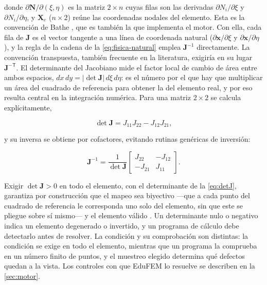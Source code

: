 donde $\partial\bm{N}/\partial(\xi,\eta)$ es la matriz $2\times n$ cuyas filas son las derivadas $\partial N_i/\partial\xi$ y $\partial N_i/\partial\eta$, y $\bm{X}_e$ ($n\times 2$) reúne las coordenadas nodales del elemento. Esta es la convención de Bathe \autocite[p.~345]{bathe2014fem}, que es también la que implementa el motor. Con ella, cada fila de $\bm{J}$ es el vector tangente a una línea de coordenada natural ($\partial\bm{x}/\partial\xi$ y $\partial\bm{x}/\partial\eta$), y la regla de la cadena de la \autoref{eq:fisica-natural} emplea $\bm{J}^{-1}$ directamente. La convención transpuesta, también frecuente en la literatura, exigiría en su lugar $\bm{J}^{-\mathsf{T}}$. El determinante del Jacobiano mide el factor local de cambio de área entre ambos espacios, $dx\,dy = |\det\bm{J}|\,d\xi\,d\eta$: es el número por el que hay que multiplicar un área del cuadrado de referencia para obtener la del elemento real, y por eso resulta central en la integración numérica. Para una matriz $2\times2$ se calcula explícitamente,

\begin{equation}
\det\bm{J} = J_{11}J_{22} - J_{12}J_{21},
\label{eq:detJ}
\end{equation}

y su inversa se obtiene por cofactores, evitando rutinas genéricas de inversión:

\begin{equation}
\bm{J}^{-1} = \frac{1}{\det\bm{J}}
\begin{bmatrix}
J_{22} & -J_{12} \\
-J_{21} & J_{11}
\end{bmatrix}.
\label{eq:invJ}
\end{equation}

Exigir $\det\bm{J} > 0$ en todo el elemento, con el determinante de la \autoref{eq:detJ}, garantiza por construcción que el mapeo sea biyectivo ---que a cada punto del cuadrado de referencia le corresponda uno solo del elemento, sin que este se pliegue sobre sí mismo--- y el elemento válido \autocites[pp.~346-347]{bathe2014fem}[p.~236]{cook2002concepts}. Un determinante nulo o negativo indica un elemento degenerado o invertido, y un programa de cálculo debe detectarlo antes de resolver. La condición y su comprobación son distintas: la condición se exige en todo el elemento, mientras que un programa la comprueba en un número finito de puntos, y el muestreo elegido determina qué defectos quedan a la vista. Los controles con que EduFEM lo resuelve se describen en la \autoref{sec:motor}.

